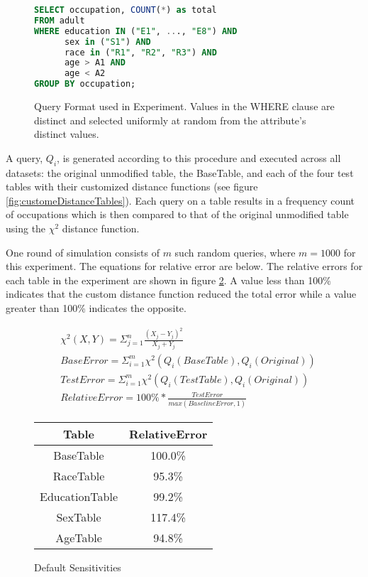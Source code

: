 \begin{figure}
\begin{lstlisting}[language=SQL]
SELECT occupation, COUNT(*) as total
FROM adult
WHERE education IN ("E1", ..., "E8") AND
      sex in ("S1") AND
      race in ("R1", "R2", "R3") AND
      age > A1 AND
      age < A2
GROUP BY occupation;
\end{lstlisting}
\caption{Query Format used in Experiment. Values in the WHERE clause are distinct and selected uniformly at random from the attribute's distinct values.}
\label{fig:queryFormat}
\end{figure}

A query, $Q_i$, is generated according to this procedure and executed across all datasets: the original unmodified table, the BaseTable, and each of the four test tables with their customized distance functions (see figure \ref{fig:customeDistanceTables}). Each query on a table results in a frequency count of occupations which is then compared to that of the original unmodified table using the $\chi^2$ distance function.

One round of simulation consists of $m$ such random queries, where $m=1000$ for this experiment. The equations for relative error are below. The relative errors for each table in the experiment are shown in figure \ref{fig:relativeErrorDefault}. A value less than 100\% indicates that the custom distance function reduced the total error while a value greater than 100\% indicates the opposite.

\begin{align*}
& \chi^2(X, Y) = \Sigma_{j=1}^{n} \frac{(X_j - Y_j)^2}{X_j + Y_j} \tag{1}\\
& BaseError = \Sigma_{i=1}^{m} \chi^2(Q_i(BaseTable), Q_i(Original)) \tag{2} \\
& TestError = \Sigma_{i=1}^{m} \chi^2(Q_i(TestTable), Q_i(Original)) \tag{3} \\
& RelativeError = 100\% * \frac{TestError}{max(BaselineError, 1)} \tag{4}
\end{align*}


\begin{figure}
\centering
\begin{tabular}{|c||c|}
\hline
Table & RelativeError \\
\hline
\hline
BaseTable & 100.0\% \\
\hline
RaceTable & 95.3\% \\
\hline
EducationTable & 99.2\% \\
\hline
SexTable & 117.4\% \\
\hline
AgeTable & 94.8\% \\
\hline
\end{tabular}
\caption{Default Sensitivities}
\label{fig:relativeErrorDefault}
\end{figure}

